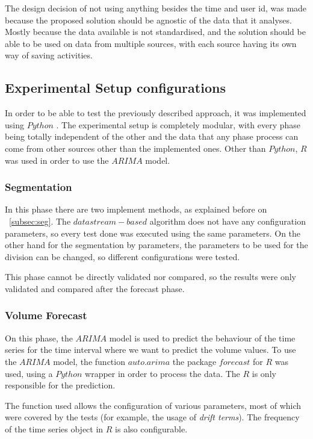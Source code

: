The design decision of not using anything besides the time and user id, was made
because the proposed solution should be agnostic of the data that it analyses.
Mostly because the data available is not standardised, and the solution should be
able to be used on data from multiple sources, with each source having its own
way of saving activities.

\subsection{Experimental Setup configurations}

In order to be able to test the previously described approach, it was
implemented
using $Python$ . The experimental setup is completely modular, with every phase
being
totally independent of the other and the data that any phase process can come
from other sources other than the implemented ones.
Other than $Python$, $R$ was used in order to use the $ARIMA$ model.

\subsubsection*{Segmentation}

In this phase there are two implement methods, as explained
before on ~\ref{subsec:seg}. The $data stream-based$ algorithm does not have any
configuration parameters, so every test done was executed using the same parameters.
On the other hand for the segmentation by parameters, the parameters to be used for
the division can be changed, so different configurations were tested.

This phase cannot be directly validated nor compared, so the results were
only validated and compared after the forecast phase.

\subsubsection*{Volume Forecast}

On this phase, the $ARIMA$ model is used to predict the behaviour of the time
series for the time interval where we want to predict the volume values. To use
the $ARIMA$ model, the function $auto.arima$ the package $forecast$ \cite{hyndman2007automatic} for $R$
was used, using a $Python$ wrapper in order to process the data. The $R$ is only
responsible for the prediction.

The function used allows the configuration of various parameters, most of which
were covered by the tests (for example, the usage of \emph{drift terms}).
The frequency of the time series object in
$R$ is also configurable.

